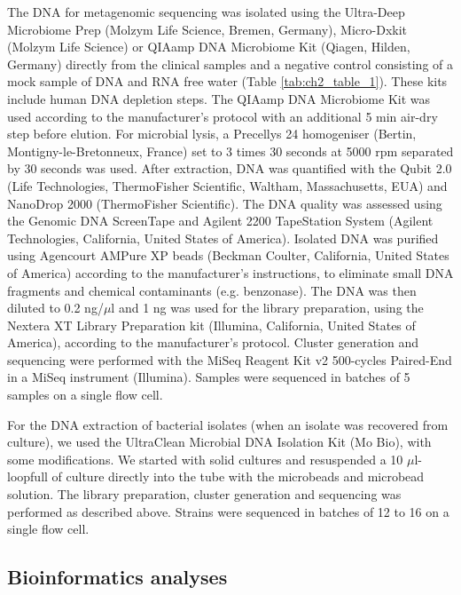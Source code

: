 The DNA for metagenomic sequencing was isolated using the Ultra-Deep Microbiome Prep (Molzym Life Science, Bremen, Germany), Micro-Dx\texttrademark kit (Molzym Life Science) or QIAamp DNA Microbiome Kit (Qiagen, Hilden, Germany) directly from the clinical samples and a negative control consisting of a mock sample of DNA and RNA free water (Table \ref{tab:ch2_table_1}). 
These kits include human DNA depletion steps. 
The QIAamp DNA Microbiome Kit was used according to the manufacturer’s protocol with an additional 5 min air-dry step before elution. 
For microbial lysis, a Precellys 24 homogeniser (Bertin, Montigny-le-Bretonneux, France) set to 3 times 30 seconds at 5000 rpm separated by 30 seconds was used. 
After extraction, DNA was quantified with the Qubit 2.0 (Life Technologies, ThermoFisher Scientific, Waltham, Massachusetts, EUA) and NanoDrop 2000 (ThermoFisher Scientific). 
The DNA quality was assessed using the Genomic DNA ScreenTape and Agilent 2200 TapeStation System (Agilent Technologies, California, United States of America). 
Isolated DNA was purified using Agencourt AMPure XP beads (Beckman Coulter, California, United States of America) according to the manufacturer’s instructions, to eliminate small DNA fragments and chemical contaminants (e.g. benzonase). 
The DNA was then diluted to 0.2 ng/$\mu$l and 1 ng was used for the library preparation, using the Nextera XT Library Preparation kit (Illumina, California, United States of America), according to the manufacturer’s protocol. 
Cluster generation and sequencing were performed with the MiSeq Reagent Kit v2 500-cycles Paired-End in a MiSeq instrument (Illumina). 
Samples were sequenced in batches of 5 samples on a single flow cell.

For the DNA extraction of bacterial isolates (when an isolate was recovered from culture), we used the UltraClean Microbial DNA Isolation Kit (Mo Bio), with some modifications. 
We started with solid cultures and resuspended a 10 $\mu$l-loopfull of culture directly into the tube with the microbeads and microbead solution. 
The library preparation, cluster generation and sequencing was performed as described above. 
Strains were sequenced in batches of 12 to 16 on a single flow cell.

\subsection{Bioinformatics analyses} \label{ssec:sample_bioinformatics}

